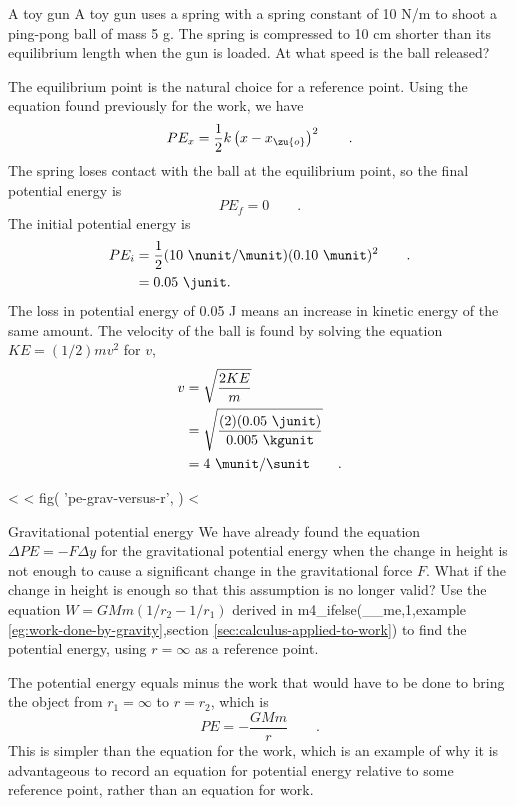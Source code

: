 \begin{eg}{A toy gun}
\egquestion A toy gun uses a spring with a spring constant of 10 N/m to shoot a
ping-pong ball of mass 5 g. The spring is compressed to 10
cm shorter than its equilibrium length when the gun is
loaded. At what speed is the ball released?

\eganswer The equilibrium point is the natural choice for a
reference point. Using the equation found previously
for the work, we have
\begin{equation*}
                PE_x  =   \frac{1}{2}k\left(x-x_\zu{o}\right)^2  \qquad   .
\end{equation*}
The spring loses contact with the ball at the equilibrium
point, so the final potential energy is
\begin{equation*}
                PE_f          =  0   \qquad   .
\end{equation*}
The initial potential energy is
\begin{align*}
 PE_i &= \frac{1}{2}(10\ \nunit/\munit)(0.10\ \munit)^2 \qquad . \\
 &= 0.05\ \junit.
\end{align*}
The loss in potential energy of 0.05 J means an increase
in kinetic energy of the same amount. The velocity of the
ball is found by solving the equation $KE=(1/2)mv^2$ for $v$,
\begin{align*}
 v &= \sqrt{\frac{2KE}{m}}\\
 &= \sqrt{\frac{(2)(0.05\ \junit)}{0.005\ \kgunit}}\\
 &= 4\ \munit/\sunit \qquad .
\end{align*}
\end{eg}

<%
<%
  fig(
    'pe-grav-versus-r',
  )
<%

\begin{eg}{Gravitational potential energy}\label{eg:pe-grav}
\egquestion We have already found the equation
$\Delta PE = -F\Delta y$ for the gravitational potential
energy when the change in height is not enough to cause a
significant change in the gravitational force $F$. What if
the change in height is enough so that this assumption is no
longer valid? Use the equation $W=GMm(1/r_2-1/r_1)$ derived in
m4_ifelse(__me,1,example \ref{eg:work-done-by-gravity},section \ref{sec:calculus-applied-to-work})
to find the potential energy, using $r=\infty$
as a reference point.

\eganswer The potential energy equals minus the work that
would have to be done to bring the object from $r_1=\infty$
 to $r= r_2$, which is
\begin{equation*}
                   PE  =  -\frac{GMm}{r} \qquad .
\end{equation*}
This is simpler than the equation for the work, which is an
example of why it is advantageous to record an equation for
potential energy relative to some reference point, rather
than an equation for work.
\end{eg}

